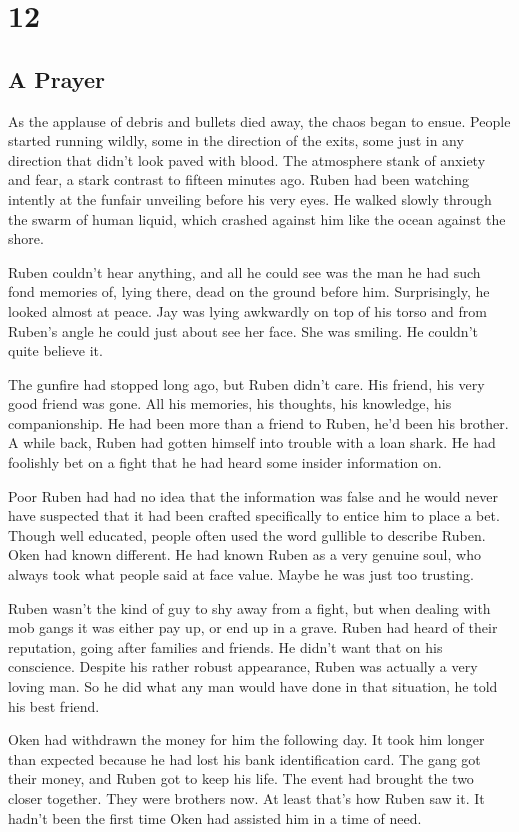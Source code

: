 \chapter{12}
\section{A Prayer}


As the applause of debris and bullets died away, the chaos began to ensue.  People started running wildly, some in the direction of the exits, some just in any direction that didn't look paved with blood.  The atmosphere stank of anxiety and fear, a stark contrast to fifteen minutes ago.  Ruben had been watching intently at the funfair unveiling before his very eyes.  He walked slowly through the swarm of human liquid, which crashed against him like the ocean against the shore.

Ruben couldn't hear anything, and all he could see was the man he had such fond memories of, lying there, dead on the ground before him.  Surprisingly, he looked almost at peace.  Jay was lying awkwardly on top of his torso and from Ruben's angle he could just about see her face.  She was smiling.  He couldn't quite believe it.

The gunfire had stopped long ago, but Ruben didn't care.  His friend, his very good friend was gone.  All his memories, his thoughts, his knowledge, his companionship.  He had been more than a friend to Ruben, he'd been his brother.  A while back, Ruben had gotten himself into trouble with a loan shark.  He had foolishly bet on a fight that he had heard some insider information on.  

Poor Ruben had had no idea that the information was false and he would never have suspected that it had been crafted specifically to entice him to place a bet.  Though well educated, people often used the word gullible to describe Ruben.  Oken had known different.  He had known Ruben as a very genuine soul, who always took what people said at face value.  Maybe he was just too trusting.

Ruben wasn't the kind of guy to shy away from a fight, but when dealing with mob gangs it was either pay up, or end up in a grave.  Ruben had heard of their reputation, going after families and friends.  He didn't want that on his conscience.  Despite his rather robust appearance, Ruben was actually a very loving man.  So he did  what any man would have done in that situation, he told his best friend.

Oken had withdrawn the money for him the following day.  It took him longer than expected because he had lost his bank identification card.  The gang got their money, and Ruben got to keep his life.  The event had brought the two closer together.  They were brothers now.  At least that's how Ruben saw it.  It hadn't been the first time Oken had assisted him in a time of need.

